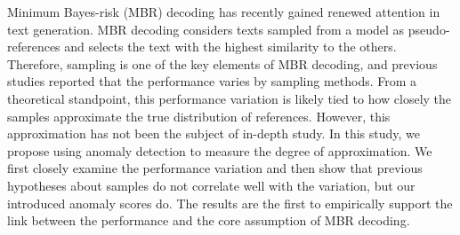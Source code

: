 Minimum Bayes-risk (MBR) decoding has recently gained renewed attention in text generation. MBR decoding considers texts sampled from a model as pseudo-references and selects the text with the highest similarity to the others. Therefore, sampling is one of the key elements of MBR decoding, and previous studies reported that the performance varies by sampling methods. From a theoretical standpoint, this performance variation is likely tied to how closely the samples approximate the true distribution of references. However, this approximation has not been the subject of in-depth study. In this study, we propose using anomaly detection to measure the degree of approximation. We first closely examine the performance variation and then show that previous hypotheses about samples do not correlate well with the variation, but our introduced anomaly scores do. The results are the first to empirically support the link between the performance and the core assumption of MBR decoding.